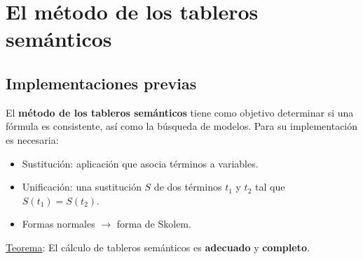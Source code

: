 \documentclass{beamer}
\begin{document}
\section{El método de los tableros semánticos}
\subsection{Implementaciones previas}
\begin{frame}
  El \textbf{método de los tableros semánticos} tiene como objetivo determinar si una fórmula es consistente, así como la búsqueda de modelos. Para su implementación es necesaria:
  \begin{itemize}
  \item Sustitución: aplicación que asocia términos a variables.
  \item Unificación: una sustitución $S$ de dos términos $t_1$ y $t_2$ tal que $S(t_1)=S(t_2)$. 
  \item Formas normales $\longrightarrow$ forma de Skolem.
  \end{itemize}
\underline{Teorema}: El cálculo de tableros semánticos es \textbf{adecuado} y \textbf{completo}.  
\end{frame}
\end{document}
